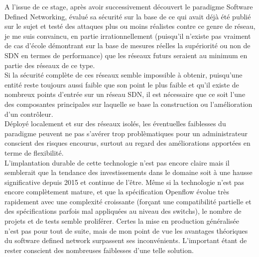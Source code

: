 A l'issue de ce stage, après avoir successivement découvert le paradigme Software Defined Networking, évalué sa sécurité sur la base de ce qui avait déjà été publié sur le sujet et testé des attaques plus ou moins réalistes contre ce genre de réseau, je me suis convaincu, en partie irrationnellement (puisqu'il n'existe pas vraiment de cas d'école démontrant sur la base de mesures réelles la supériorité ou non de SDN en termes de performance) que les réseaux futurs seraient au minimum en partie des réseaux de ce type.\\
Si la sécurité complète de ces réseaux semble impossible à obtenir, puisqu'une entité reste toujours aussi faible que son point le plus faible et qu'il existe de nombreux points d'entrée sur un réseau SDN, il est nécessaire que ce soit l'une des composantes principales sur laquelle se base la construction ou l'amélioration d'un contrôleur.\\
Déployé localement et sur des réseaux isolés, les éventuelles faiblesses du paradigme peuvent ne pas s'avérer trop problèmatiques pour un administrateur conscient des risques encourus, surtout au regard des améliorations apportées en terme de flexibilité.\\
L'implantation durable de cette technologie n'est pas encore claire mais il semblerait que la tendance des investissements dans le domaine soit à une hausse significative depuis 2015 et continue de l'être. Même si la technologie n'est pas encore complètement mature, et que la spécification Openflow évolue très rapidement avec une complexité croissante (forçant une compatibilité partielle et des spécifications parfois mal appliquées au niveau des switchs), le nombre de projets et de tests semble proliférer. Certes la mise en production généralisée n'est pas pour tout de suite, mais de mon point de vue les avantages théoriques du software defined network surpassent ses inconvénients. L'important étant de rester conscient des nombreuses faiblesses d'une telle solution.\\

